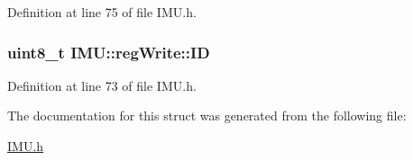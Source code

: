 Definition at line 75 of file IMU.h.

\hypertarget{struct_i_m_u_1_1reg_write_aca32b881a20ec7adc84956176aa65a7b}{
\subsubsection[{ID}]{\setlength{\rightskip}{0pt plus 5cm}uint8\_\-t {\bf IMU::regWrite::ID}}}
\label{struct_i_m_u_1_1reg_write_aca32b881a20ec7adc84956176aa65a7b}


Definition at line 73 of file IMU.h.



The documentation for this struct was generated from the following file:\begin{DoxyCompactItemize}
\item 
\hyperlink{_i_m_u_8h}{IMU.h}\end{DoxyCompactItemize}
